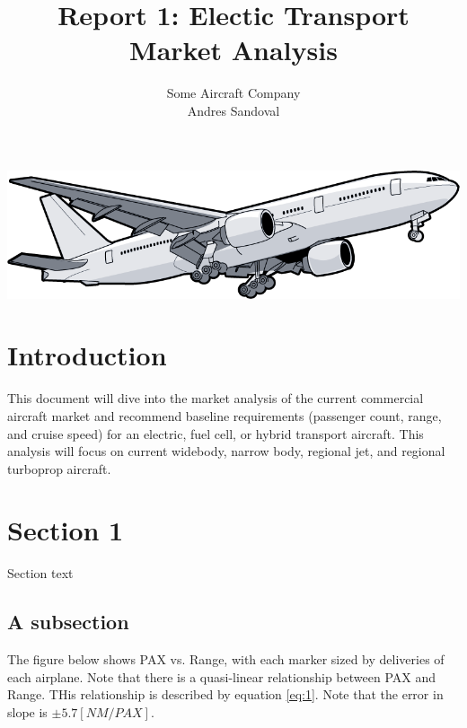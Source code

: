 \documentclass[12pt]{article} %
\title{Report 1: Electic Transport Market Analysis}
\author{Some Aircraft Company \\ Andres Sandoval}
\begin{document}
\maketitle
\begin{center}
    \includegraphics[width=1\textwidth]{cover}
\end{center}

\graphicspath{ {./market_trade/} }

\pagebreak

\tableofcontents

\listoffigures

\pagebreak

\section{Introduction}

This document will dive into the market analysis of the current commercial aircraft market and recommend baseline requirements (passenger count, range, and cruise speed) for an electric, fuel cell, or hybrid transport aircraft. This analysis will focus on current widebody, narrow body, regional jet, and regional turboprop aircraft.

\section{Section 1}

Section text

\subsection{A subsection}

The figure below shows PAX vs. Range, with each marker sized by deliveries of each airplane. Note that there is a quasi-linear relationship between PAX and Range. THis relationship is described by equation \ref{eq:1}. Note that the error in slope is $\pm 5.7 [NM/PAX]$.
\end{document}
